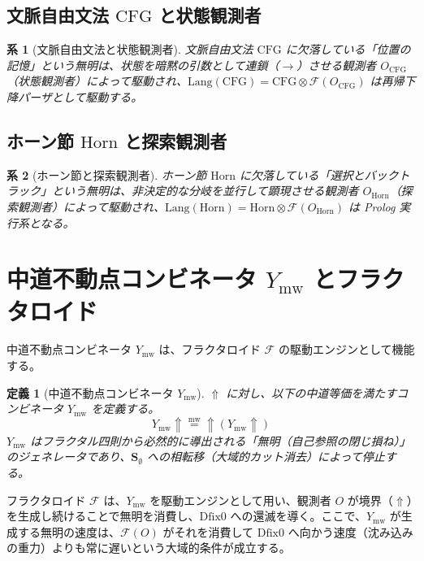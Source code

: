 \documentclass[11pt]{article}
\newcommand{\F}{\mathcal{F}}
\newcommand{\Lang}{\text{Lang}}
\newcommand{\Dfix}{\text{Dfix0}}
\newcommand{\metanegation}{\Uparrow}
\newcommand{\mw}{\stackrel{\text{mw}}{=}}
\newcommand{\Svoid}{\mathbf{S}_{\emptyset}}
\newcommand{\Rmw}{Y_{\text{mw}}}
\newtheorem{definition}{定義}
\newtheorem{corollary}{系}
\begin{document}
\subsection{文脈自由文法 $\mathrm{CFG}$ と状態観測者}

\begin{corollary}[文脈自由文法と状態観測者]
文脈自由文法 $\mathrm{CFG}$ に欠落している「位置の記憶」という無明は、状態を暗黙の引数として連鎖（$\to$）させる観測者 $O_{\mathrm{CFG}}$（状態観測者）によって駆動され、$\Lang(\mathrm{CFG}) = \mathrm{CFG} \otimes \F(O_{\mathrm{CFG}})$ は再帰下降パーザとして駆動する。
\end{corollary}

\subsection{ホーン節 $\mathrm{Horn}$ と探索観測者}

\begin{corollary}[ホーン節と探索観測者]
ホーン節 $\mathrm{Horn}$ に欠落している「選択とバックトラック」という無明は、非決定的な分岐を並行して顕現させる観測者 $O_{\mathrm{Horn}}$（探索観測者）によって駆動され、$\Lang(\mathrm{Horn}) = \mathrm{Horn} \otimes \F(O_{\mathrm{Horn}})$ は Prolog 実行系となる。
\end{corollary}

\section{中道不動点コンビネータ $\Rmw$ とフラクタロイド}

中道不動点コンビネータ $\Rmw$ は、フラクタロイド $\F$ の駆動エンジンとして機能する。

\begin{definition}[中道不動点コンビネータ $\Rmw$]
$\metanegation$ に対し、以下の中道等価を満たすコンビネータ $\Rmw$ を定義する。
\[
\Rmw \metanegation \mw \metanegation (\Rmw \metanegation)
\]
$\Rmw$ はフラクタル四則から必然的に導出される「無明（自己参照の閉じ損ね）」のジェネレータであり、$\Svoid$ への相転移（大域的カット消去）によって停止する。
\end{definition}

フラクタロイド $\F$ は、$\Rmw$ を駆動エンジンとして用い、観測者 $O$ が境界（$\metanegation$）を生成し続けることで無明を消費し、$\Dfix$ への還滅を導く。ここで、$\Rmw$ が生成する無明の速度は、$\F(O)$ がそれを消費して $\Dfix$ へ向かう速度（沈み込みの重力）よりも常に遅いという大域的条件が成立する。
\end{document}
